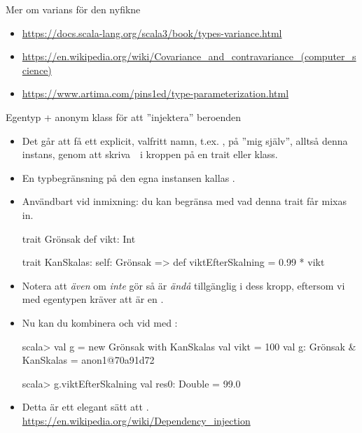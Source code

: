\begin{Slide}{Mer om varians för den nyfikne}
\begin{itemize}\SlideFontSmall
  \item \href{https://docs.scala-lang.org/scala3/book/types-variance.html}{https://docs.scala-lang.org/scala3/book/types-variance.html}
  \item \href{https://en.wikipedia.org/wiki/Covariance_and_contravariance_(computer_science)}{https://en.wikipedia.org/wiki/Covariance\_and\_contravariance\_(computer\_science)}
  \item \href{https://www.artima.com/pins1ed/type-parameterization.html}{https://www.artima.com/pins1ed/type-parameterization.html}

\end{itemize}
\end{Slide}


\begin{Slide}{Egentyp + anonym klass för att ''injektera'' beroenden}\SlideFontSmall
\begin{itemize}\SlideFontTiny
  \item Det går att få ett explicit, valfritt namn, t.ex. ,  på ''mig själv'', alltså denna instans, genom att skriva~~i kroppen på en trait eller klass. 
  \item En typbegränsning på den egna instansen kallas  . 
  \item Användbart vid inmixning: du kan begränsa med vad denna trait får mixas in.
\begin{CodeSmall}
trait Grönsak { def vikt: Int }

trait KanSkalas:
  self: Grönsak =>
  def viktEfterSkalning = 0.99 * vikt 
\end{CodeSmall}
\item Notera att \emph{även} om  \emph{inte} gör  så är \emph{ändå}  tillgänglig i dess kropp, eftersom vi med egentypen kräver att  är en .
\pause
\item Nu kan du kombinera  och  vid  med :
\begin{REPLsmall}
scala> val g = new Grönsak with KanSkalas { val vikt = 100 }
val g: Grönsak & KanSkalas = anon1@70a91d72
                                                                                    
scala> g.viktEfterSkalning
val res0: Double = 99.0
\end{REPLsmall}
\item Detta är ett elegant sätt att  .\\\url{https://en.wikipedia.org/wiki/Dependency_injection}
\end{itemize}
\end{Slide}

